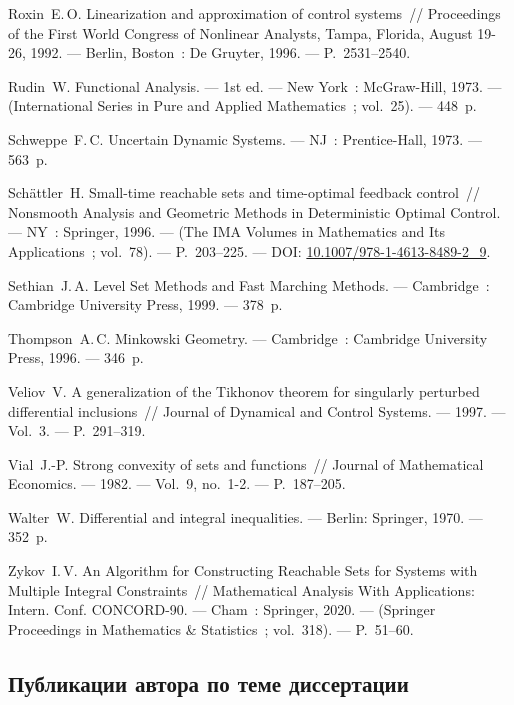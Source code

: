 \documentclass[../main.tex]{subfiles}
\begin{document}
\begin{thebibliography}{99}
Roxin~E.\,O. Linearization and approximation of control systems~// Proceedings of the First World Congress of Nonlinear Analysts, Tampa, Florida, August 19-26, 1992. --- Berlin, Boston~: De Gruyter, 1996. --- P.~2531--2540. 

Rudin~W. Functional Analysis. --- 1st ed. --- New York~: McGraw-Hill, 1973. --- (International Series in Pure and Applied Mathematics~; vol.~25). --- 448~p.

Schweppe~F.\,C. Uncertain Dynamic Systems. --- NJ~: Prentice-Hall, 1973. --- 563~p.

Sch\"{a}ttler~H. Small-time reachable sets and time-optimal feedback control~// Nonsmooth Analysis and Geometric Methods in Deterministic Optimal Control. --- NY~: Springer, 1996. --- (The IMA Volumes in Mathematics and Its Applications~; vol.~78). --- P.~203--225. --- DOI: \href{https://doi.org/10.1007/978-1-4613-8489-2_9}{10.1007/978-1-4613-8489-2\_9}.

Sethian~J.\,A. Level Set Methods and Fast Marching Methods. --- Cambridge~: Cambridge University Press, 1999. --- 378~p.

Thompson~A.\,C. Minkowski Geometry. --- Cambridge~: Cambridge University Press, 1996. --- 346~p.

Veliov~V. A generalization of the Tikhonov theorem for singularly perturbed differential inclusions~// Journal of Dynamical and Control Systems. --- 1997. --- Vol.~3. --- P.~291--319.

Vial~J.-P. Strong convexity of sets and functions~// Journal of Mathematical Economics. --- 1982. --- Vol.~9, no.~1-2. --- P.~187--205. 

Walter~W. Differential and integral inequalities. --- Berlin: Springer, 1970. --- 352~p.

Zykov~I.\,V. An Algorithm for Constructing Reachable Sets for Systems with Multiple Integral Constraints~// Mathematical Analysis With Applications: Intern. Conf. CONCORD-90. --- Cham~: Springer, 2020. --- (Springer Proceedings in Mathematics \& Statistics~; vol.~318). --- P.~51--60. 

\subsection*{Публикации автора по теме диссертации}

\end{thebibliography}
\end{document}
